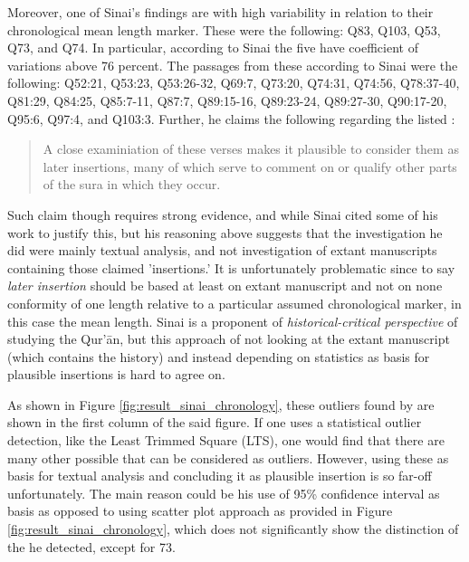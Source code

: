 Moreover, one of Sinai's findings are   with high variability in relation to their chronological mean   length marker. These   were the following: Q83, Q103, Q53, Q73, and Q74. In particular, according to Sinai the five   have coefficient of variations above 76 percent. The passages from these   according to Sinai were the following: Q52:21, Q53:23, Q53:26-32, Q69:7, Q73:20, Q74:31, Q74:56, Q78:37-40, Q81:29, Q84:25, Q85:7-11, Q87:7, Q89:15-16, Q89:23-24, Q89:27-30, Q90:17-20, Q95:6, Q97:4, and Q103:3. Further, he claims the following regarding the listed  :
\begin{quotation}
    A close examiniation of these verses makes it plausible to consider them as later insertions, many of which serve to comment on or qualify other parts of the sura in which they occur.
\end{quotation}

Such claim though requires strong evidence, and while Sinai cited some of his work to justify this, but his reasoning above suggests that the investigation he did were mainly textual analysis, and not investigation of extant manuscripts containing those claimed 'insertions.' It is unfortunately problematic since to say \textit{later insertion} should be based at least on extant manuscript and not on none conformity of one   length relative to a particular assumed chronological marker, in this case the mean   length. Sinai is a proponent of \textit{historical-critical perspective} of studying the Qur'\=an, but this approach of not looking at the extant manuscript (which contains the history) and instead depending on statistics as basis for plausible insertions is hard to agree on.

As shown in Figure \ref{fig:result_sinai_chronology}, these outliers found by \cite{sinai2020oqs} are shown in the first column of the said figure. If one uses a statistical outlier detection, like the Least Trimmed Square (LTS), one would find that there are many other possible   that can be considered as outliers. However, using these as basis for textual analysis and concluding it as plausible insertion is so far-off unfortunately. The main reason could be his use of 95\% confidence interval as basis as opposed to using scatter plot approach as provided in Figure \ref{fig:result_sinai_chronology}, which does not significantly show the distinction of the   he detected, except for   73.

